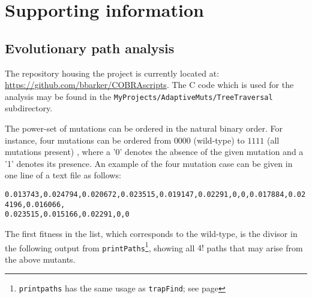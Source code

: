\section{Supporting information}

\subsection{Evolutionary path analysis}
\label{sec:pathAnalysis}

The repository housing the project is currently located at:
\url{https://github.com/bbarker/COBRAscripts}. The C code which is
used for the analysis may be found in the
\texttt{MyProjects/AdaptiveMuts/TreeTraversal} subdirectory. 


%
%

The power-set of mutations can be ordered in the natural binary order.
For instance, four mutations can be ordered from $0000$ (wild-type) to
$1111$ (all mutations present) , where a '0' denotes the absence of
the given mutation and a '1' denotes its presence. An example of the
four mutation case can be given in one line of a text file as follows:

\vspace{1ex}
\noindent
\texttt{0.013743,0.024794,0.020672,0.023515,0.019147,0.02291,0,0,0.017884,0.024196,0.016066,\\0.023515,0.015166,0.02291,0,0}
\vspace{1ex}


The first fitness in the list, which corresponds to the wild-type, is
the divisor in the following output from
\texttt{printPaths}\footnote{\texttt{printpaths} has the same usage as
\texttt{trapFind}; see page \pageref{trapFindCmd}}, showing all $4!$
paths that may arise from the above mutants.

